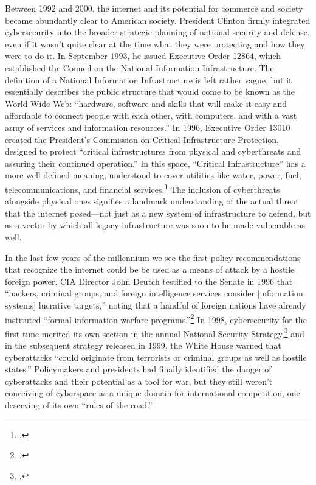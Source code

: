 \documentclass[12pt]{article}
\begin{document}
Between 1992 and 2000, the internet and its potential for commerce and society became abundantly clear to American society. President Clinton firmly integrated cybersecurity into the broader strategic planning of national security and defense, even if it wasn't quite clear at the time what they were protecting and how they were to do it. In September 1993, he issued Executive Order 12864, which established the Council on the National Information Infrastructure. The definition of a National Information Infrastructure is left rather vague, but it essentially describes the public structure that would come to be known as the World Wide Web: ``hardware, software and skills that will make it easy and affordable to connect people with each other, with computers, and with a vast array of services and information resources.'' In 1996, Executive Order 13010 created the President's Commission on Critical Infrastructure Protection, designed to protect ``critical infrastructures from physical and cyberthreats and assuring their continued operation.'' In this space, ``Critical Infrastructure'' has a more well-defined meaning, understood to cover utilities like water, power, fuel, telecommunications, and financial services.\footcite[~p.761. Completely omitted from this thesis is the concurrent debate about the role the government should play in regulating encryption technology. At the same time it was drafting the Executive Orders mentioned above, the Clinton administration was also taking executive action to manage encryption. The encryption debate (which is still ongoing today) raises a lot of questions about the relationship between the federal government, civil liberties, and law enforcement, as well as more generic national security concerns. It is however mostly irrelevant the specific international political questions that motivate this inquriy, and as such is not included here.]{boys_clinton_2018} The inclusion of cyberthreats alongside physical ones signifies a landmark understanding of the actual threat that the internet posed---not just as a new system of infrastructure to defend, but as a vector by which all legacy infrastructure was soon to be made vulnerable as well. 

In the last few years of the millennium we see the first policy recommendations that recognize the internet could be be used as a means of attack by a hostile foreign power. CIA Director John Deutch testified to the Senate in 1996 that ``hackers, criminal groups, and foreign intelligence services consider [information systems] lucrative targets,'' noting that a handful of foreign nations have already instituted ``formal information warfare programs.''\footcite{deutch_worldwide_1996} In 1998, cybersecurity for the first time merited its own section in the annual National Security Strategy,\footcite[~p.761]{boys_clinton_2018} and in the subsequent strategy released in 1999, the White House warned that cyberattacks ``could originate from terrorists or criminal groups as well as hostile states.'' Policymakers and presidents had finally identified the danger of cyberattacks and their potential as a tool for war, but they still weren't conceiving of cyberspace as a unique domain for international competition, one deserving of its own ``rules of the road.''
\end{document}
